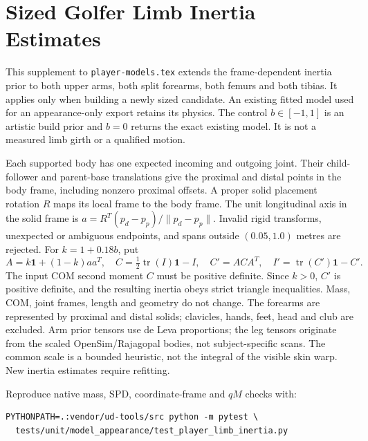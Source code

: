 \documentclass{article}
\begin{document}
\section*{Sized Golfer Limb Inertia Estimates}
This supplement to \texttt{player-models.tex} extends the frame-dependent
inertia prior to both upper arms, both split forearms, both femurs and both
tibias. It applies only when building a newly sized candidate. An existing
fitted model used for an appearance-only export retains its physics. The
control $b\in[-1,1]$ is an artistic build prior and $b=0$ returns the exact
existing model. It is not a measured limb girth or a qualified motion.

Each supported body has one expected incoming and outgoing joint. Their
child-follower and parent-base translations give the proximal and distal
points in the body frame, including nonzero proximal offsets. A proper solid
placement rotation $R$ maps its local frame to the body frame. The unit
longitudinal axis in the solid frame is $a=R^T(p_d-p_p)/\|p_d-p_p\|$.
Invalid rigid transforms, unexpected or ambiguous endpoints, and spans outside
$(0.05,1.0)$ metres are rejected. For $k=1+0.18b$, put
\[ A=k\mathbf{1}+(1-k)aa^T,\quad
C=\tfrac12\operatorname{tr}(I)\mathbf{1}-I,\quad
C'=ACA^T,\quad I'=\operatorname{tr}(C')\mathbf{1}-C'. \]
The input COM second moment $C$ must be positive definite. Since $k>0$,
$C'$ is positive definite, and the resulting inertia obeys strict triangle
inequalities. Mass, COM, joint frames, length and geometry do not change.
The forearms are represented by proximal and distal solids; clavicles, hands,
feet, head and club are excluded. Arm prior tensors use de Leva proportions;
the leg tensors originate from the scaled OpenSim/Rajagopal bodies, not
subject-specific scans. The common scale is a bounded heuristic, not the
integral of the visible skin warp. New inertia estimates require refitting.

Reproduce native mass, SPD, coordinate-frame and $qM$ checks with:
\begin{verbatim}
PYTHONPATH=.:vendor/ud-tools/src python -m pytest \
  tests/unit/model_appearance/test_player_limb_inertia.py
\end{verbatim}
\end{document}
